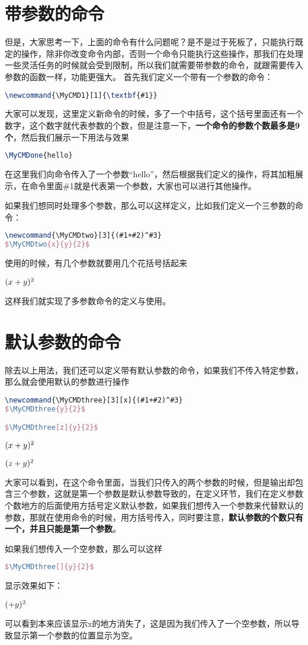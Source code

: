 \section{带参数的命令}
但是，大家思考一下，上面的命令有什么问题呢？是不是过于死板了，只能执行既定的操作，除非你改变命令内部，否则一个命令只能执行这些操作，那我们在处理一些灵活任务的时候就会受到限制，所以我们就需要带参数的命令，就跟需要传入参数的函数一样，功能更强大。
首先我们定义一个带有一个参数的命令：
\begin{lstlisting}[language=TeX]
\newcommand{\MyCMD1}[1]{\textbf{#1}}
\end{lstlisting}
大家可以发现，这里定义新命令的时候，多了一个中括号，这个括号里面还有一个数字，这个数字就代表参数的个数，但是注意一下，\textbf{一个命令的参数个数最多是9个}，然后我们展示一下用法与效果
\begin{lstlisting}[language=TeX]
\MyCMDone{hello}
\end{lstlisting}


在这里我们向命令传入了一个参数“hello”，然后根据我们定义的操作，将其加粗展示，在命令里面\#1就是代表第一个参数，大家也可以进行其他操作。

如果我们想同时处理多个参数，那么可以这样定义，比如我们定义一个三参数的命令：
\begin{lstlisting}[language=TeX]
\newcommand{\MyCMDtwo}[3]{(#1+#2)^#3}
$\MyCMDtwo{x}{y}{2}$
\end{lstlisting}

使用的时候，有几个参数就要用几个花括号括起来

$\MyCMDtwo{x}{y}{2}$

这样我们就实现了多参数命令的定义与使用。
\section{默认参数的命令}
除去以上用法，我们还可以定义带有默认参数的命令，如果我们不传入特定参数，那么就会使用默认的参数进行操作
\begin{lstlisting}[language=TeX]
\newcommand{\MyCMDthree}[3][x]{(#1+#2)^#3}
$\MyCMDthree{y}{2}$

$\MyCMDthree[z]{y}{2}$
\end{lstlisting}
$\MyCMDthree{y}{2}$

$\MyCMDthree[z]{y}{2}$

大家可以看到，在这个命令里面，当我们只传入的两个参数的时候，但是输出却包含三个参数，这就是第一个参数是默认参数导致的，在定义环节，我们在定义参数个数地方的后面使用方括号定义默认参数，如果我们想传入一个参数来代替默认的参数，那就在使用命令的时候，用方括号传入，同时要注意，\textbf{默认参数的个数只有一个，并且只能是第一个参数}。

如果我们想传入一个空参数，那么可以这样
\begin{lstlisting}[language=TeX]
$\MyCMDthree[]{y}{2}$
\end{lstlisting}

显示效果如下：

$\MyCMDthree[]{y}{2}$

可以看到本来应该显示x的地方消失了，这是因为我们传入了一个空参数，所以导致显示第一个参数的位置显示为空。
\begin{lstlisting}[language=TeX]

\end{lstlisting}